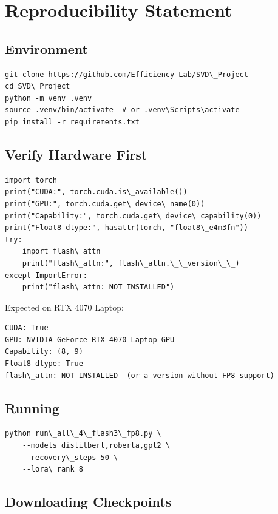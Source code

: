 
\section{Reproducibility Statement}

\subsection{Environment}

\begin{lstlisting}
git clone https://github.com/Efficiency Lab/SVD\_Project
cd SVD\_Project
python -m venv .venv
source .venv/bin/activate  # or .venv\Scripts\activate
pip install -r requirements.txt
\end{lstlisting}

\subsection{Verify Hardware First}

\begin{lstlisting}
import torch
print("CUDA:", torch.cuda.is\_available())
print("GPU:", torch.cuda.get\_device\_name(0))
print("Capability:", torch.cuda.get\_device\_capability(0))
print("Float8 dtype:", hasattr(torch, "float8\_e4m3fn"))
try:
    import flash\_attn
    print("flash\_attn:", flash\_attn.\_\_version\_\_)
except ImportError:
    print("flash\_attn: NOT INSTALLED")
\end{lstlisting}

Expected on RTX 4070 Laptop:

\begin{lstlisting}
CUDA: True
GPU: NVIDIA GeForce RTX 4070 Laptop GPU
Capability: (8, 9)
Float8 dtype: True
flash\_attn: NOT INSTALLED  (or a version without FP8 support)
\end{lstlisting}

\subsection{Running}

\begin{lstlisting}
python run\_all\_4\_flash3\_fp8.py \
    --models distilbert,roberta,gpt2 \
    --recovery\_steps 50 \
    --lora\_rank 8
\end{lstlisting}

\subsection{Downloading Checkpoints}


